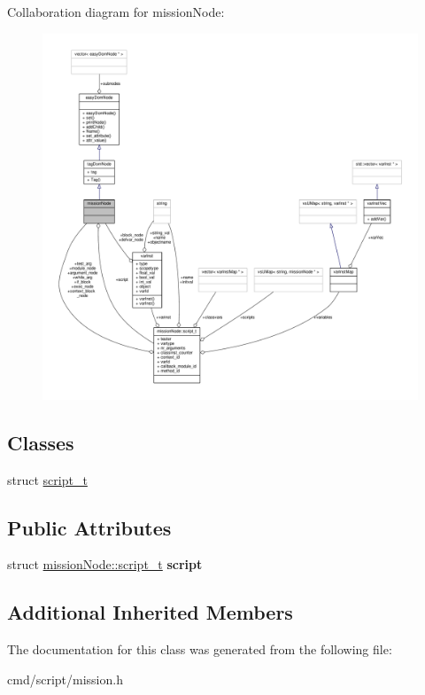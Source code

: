 Collaboration diagram for mission\+Node\+:
\nopagebreak
\begin{figure}[H]
\begin{center}
\leavevmode
\includegraphics[width=350pt]{da/daf/classmissionNode__coll__graph}
\end{center}
\end{figure}
\subsection*{Classes}
\begin{DoxyCompactItemize}
\item 
struct \hyperlink{structmissionNode_1_1script__t}{script\+\_\+t}
\end{DoxyCompactItemize}
\subsection*{Public Attributes}
\begin{DoxyCompactItemize}
\item 
struct \hyperlink{structmissionNode_1_1script__t}{mission\+Node\+::script\+\_\+t} {\bfseries script}\hypertarget{classmissionNode_a001e298b024945ebd0ee89738a97200f}{}\label{classmissionNode_a001e298b024945ebd0ee89738a97200f}

\end{DoxyCompactItemize}
\subsection*{Additional Inherited Members}


The documentation for this class was generated from the following file\+:\begin{DoxyCompactItemize}
\item 
cmd/script/mission.\+h\end{DoxyCompactItemize}

